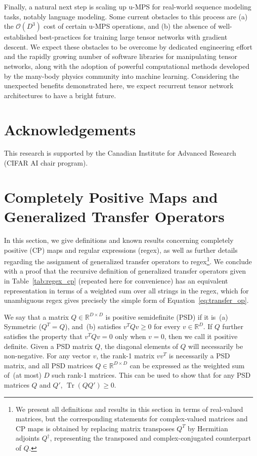 \documentclass[twoside]{article}
\DeclareMathOperator{\Tr}{Tr}
\newcommand{\bigO}{\mc{O}}
\newcommand{\R}{\mathbb{R}}
\newcommand{\field}[1]{\R^{#1}}
\newcommand{\mc}[1]{\mathcal{#1}}
\begin{document}
Finally, a natural next step is scaling up u-MPS for real-world sequence modeling tasks, notably language modeling. Some current obstacles to this process are (a) the $\bigO(D^3)$ cost of certain u-MPS operations, and (b) the absence of well-established best-practices for training large tensor networks with gradient descent. We expect these obstacles to be overcome by dedicated engineering effort and the rapidly growing number of software libraries for manipulating tensor networks, along with the adoption of powerful computational methods developed by the many-body physics community into machine learning. Considering the unexpected benefits demonstrated here, we expect recurrent tensor network architectures to have a bright future. 

\section*{Acknowledgements}
This research is supported by the Canadian Institute for Advanced Research (CIFAR AI chair program).

\appendix
\onecolumn

\section{Completely Positive Maps and Generalized Transfer Operators}
\label{sec:appendix_a}

In this section, we give definitions and known results concerning completely positive (CP) maps and regular expressions (regex), as well as further details regarding the assignment of generalized transfer operators to regex\footnote{We present all definitions and results in this section in terms of real-valued matrices, but the corresponding statements for complex-valued matrices and CP maps is obtained by replacing matrix transposes $Q^T$ by Hermitian adjoints $Q^\dagger$, representing the transposed and complex-conjugated counterpart of $Q$.}. We conclude with a proof that the recursive definition of generalized transfer operators given in Table~\ref{tab:regex_cp}
(repeated here for convenience) has an equivalent representation in terms of a weighted sum over all strings in the regex, which for unambiguous regex gives precisely the simple form of Equation~\ref{eq:transfer_op}.

We say that a matrix $Q\in\field{D\times D}$ is positive semidefinite (PSD) if it is~(a) Symmetric ($Q^T = Q$), and~(b) satisfies $v^T Q v \geq 0$ for every $v\in\field{D}$. If $Q$ further satisfies the property that $v^T Q v = 0$ only when $v = 0$, then we call it positive definite. Given a PSD matrix $Q$, the diagonal elements of $Q$ will necessarily be non-negative. For any vector $v$, the rank-1 matrix $vv^T$ is necessarily a PSD matrix, and all PSD matrices $Q\in\field{D\times D}$ can be expressed as the weighted sum of~(at most) $D$ such rank-1 matrices. This can be used to show that for any PSD matrices $Q$ and $Q'$, $\Tr(QQ') \geq0$.
\end{document}
